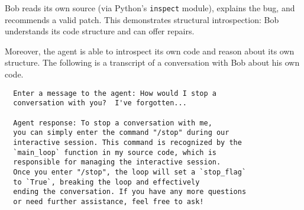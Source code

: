\documentclass[conference]{IEEEtran}
\begin{document}
Bob reads its own source (via Python’s \texttt{inspect} module), explains the bug, 
and recommends a valid patch. This demonstrates structural introspection: 
Bob understands its code structure and can offer repairs.

Moreover, the agent is able to introspect its own code and reason 
about its own structure.  The following is a transcript of a conversation with Bob about his own code.

\begin{verbatim}
  Enter a message to the agent: How would I stop a 
  conversation with you?  I've forgotten...

  Agent response: To stop a conversation with me, 
  you can simply enter the command "/stop" during our 
  interactive session. This command is recognized by the 
  `main_loop` function in my source code, which is 
  responsible for managing the interactive session. 
  Once you enter "/stop", the loop will set a `stop_flag` 
  to `True`, breaking the loop and effectively 
  ending the conversation. If you have any more questions 
  or need further assistance, feel free to ask!
  \end{verbatim}
\end{document}
